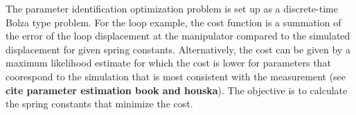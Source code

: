 \documentclass[letterpaper, 10pt, conference]{ieeeconf}
\begin{document}





The parameter identification optimization problem is set up as a discrete-time Bolza type problem.  For the loop example, the cost function is a summation of the error of the loop displacement at the manipulator compared to the simulated displacement for given spring constants.  Alternatively, the cost can be given by a maximum likelihood estimate for which the cost is lower for parameters that coorespond to the simulation that is most consistent with the measurement (see \textbf{cite parameter estimation book and houska}).  The objective is to calculate the spring constants that minimize the cost.  
\end{document}
